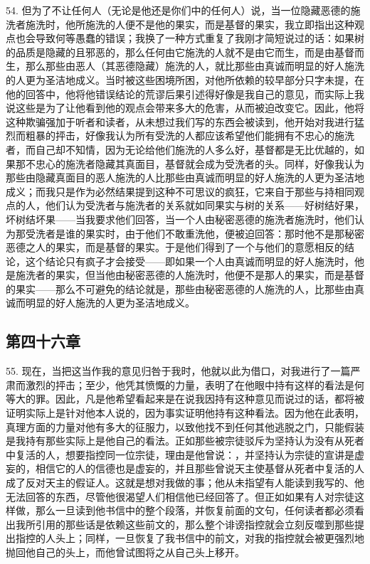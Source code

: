 54. 但为了不让任何人（无论是他还是你们中的任何人）说，当一位隐藏恶德的施洗者施洗时，他所施洗的人便不是他的果实，而是基督的果实，我立即指出这种观点也会导致何等愚蠢的错误；我换了一种方式重复了我刚才简短说过的话：如果树的品质是隐藏的且邪恶的，那么任何由它施洗的人就不是由它而生，而是由基督而生，那么那些由恶人（其恶德隐藏）施洗的人，就比那些由真诚而明显的好人施洗的人更为圣洁地成义。当时被这些困境所困，对他所依赖的较早部分只字未提，在他的回答中，他将他错误结论的荒谬后果引述得好像是我自己的意见，而实际上我说这些是为了让他看到他的观点会带来多大的危害，从而被迫改变它。因此，他将这种欺骗强加于听者和读者，从未想过我们写的东西会被读到，他开始对我进行猛烈而粗暴的抨击，好像我认为所有受洗的人都应该希望他们能拥有不忠心的施洗者，而自己却不知情，因为无论给他们施洗的人多么好，基督都是无比优越的，如果那不忠心的施洗者隐藏其真面目，基督就会成为受洗者的头。同样，好像我认为那些由隐藏真面目的恶人施洗的人比那些由真诚而明显的好人施洗的人更为圣洁地成义；而我只是作为必然结果提到这种不可思议的疯狂，它来自于那些与持相同观点的人，他们认为受洗者与施洗者的关系就如同果实与树的关系——好树结好果，坏树结坏果——当我要求他们回答，当一个人由秘密恶德的施洗者施洗时，他们认为那受洗者是谁的果实时，由于他们不敢重洗他，便被迫回答：那时他不是那秘密恶德之人的果实，而是基督的果实。于是他们得到了一个与他们的意愿相反的结论，这个结论只有疯子才会接受——即如果一个人由真诚而明显的好人施洗时，他是施洗者的果实，但当他由秘密恶德的人施洗时，他便不是那人的果实，而是基督的果实——那么不可避免的结论就是，那些由秘密恶德的人施洗的人，比那些由真诚而明显的好人施洗的人更为圣洁地成义。\par


\subsection{第四十六章}

55. 现在，当把这当作我的意见归咎于我时，他就以此为借口，对我进行了一篇严肃而激烈的抨击；至少，他凭其愤慨的力量，表明了在他眼中持有这样的看法是何等大的罪。因此，凡是他希望看起来是在说我因持有这种意见而说过的话，都将被证明实际上是针对他本人说的，因为事实证明他持有这种看法。因为他在此表明，真理方面的力量对他有多大的征服力，以致他找不到任何其他逃脱之门，只能假装是我持有那些实际上是他自己的看法。正如那些被宗徒驳斥为坚持认为没有从死者中复活的人，想要指控同一位宗徒，理由是他曾说：，并坚持认为宗徒的宣讲是虚妄的，相信它的人的信德也是虚妄的，并且那些曾说天主使基督从死者中复活的人成了反对天主的假证人。这就是想对我做的事；他从未指望有人能读到我写的、他无法回答的东西，尽管他很渴望人们相信他已经回答了。但正如如果有人对宗徒这样做，那么一旦读到他书信中的整个段落，并恢复前面的文句，任何读者都必须看出我所引用的那些话是依赖这些前文的，那么整个诽谤指控就会立刻反噬到那些提出指控的人头上；同样，一旦恢复了我书信中的前文，对我的指控就会被更强烈地抛回他自己的头上，而他曾试图将之从自己头上移开。\par

